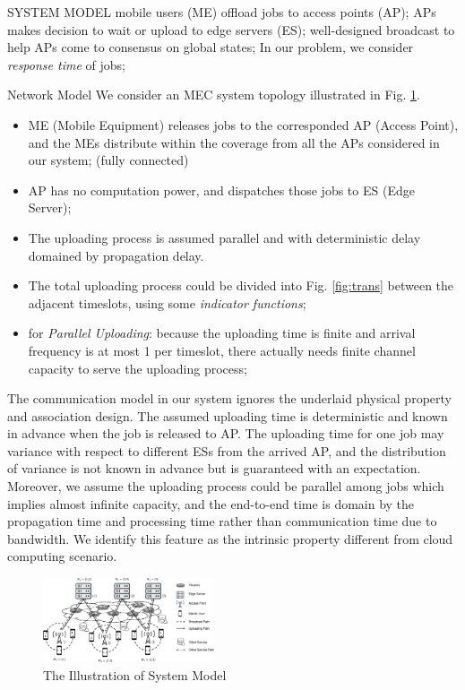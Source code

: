 \documentclass[10pt, conference, letterpaper]{IEEEtran}
\begin{document}
    \begin{section}{SYSTEM MODEL}
        \label{sec:model}
        mobile users (ME) offload jobs to access points (AP);
        APs makes decision to wait or upload to edge servers (ES);
        well-designed broadcast to help APs come to consensus on global states;
        In our problem, we consider \emph{response time} of jobs;

        \begin{subsection}{Network Model}
            We consider an MEC system topology illustrated in Fig. \ref{fig:system}.
            \begin{itemize}
                \item ME (Mobile Equipment) releases jobs to the corresponded AP (Access Point), and the MEs distribute within the coverage from all the APs considered in our system; (fully connected)
                \item AP has no computation power, and dispatches those jobs to ES (Edge Server);
                \item The uploading process is assumed parallel and with deterministic delay domained by propagation delay.
                \item The total uploading process could be divided into Fig. \ref{fig:trans} between the adjacent timeslots, using some \emph{indicator functions};
                \item for \emph{Parallel Uploading}: because the uploading time is finite and arrival frequency is at most 1 per timeslot, there actually needs finite channel capacity to serve the uploading process;
            \end{itemize}

            The communication model in our system ignores the underlaid physical property and association design.
            The assumed uploading time is deterministic and known in advance when the job is released to AP. The uploading time for one job may variance with respect to different ESs from the arrived AP, and the distribution of variance is not known in advance but is guaranteed with an expectation.
            Moreover, we assume the uploading process could be parallel among jobs which implies almost infinite capacity, and the end-to-end time is domain by the propagation time and processing time rather than communication time due to bandwidth. We identify this feature as the intrinsic property different from cloud computing scenario.
            \begin{figure}[ht]
                \centering
                \includegraphics[width=0.45\textwidth, trim={0.5cm 0.5cm 0.5cm 0.5cm}, clip]{system-model.pdf}
                \caption{The Illustration of System Model}
                \label{fig:system}
            \end{figure}
                

\end{subsection}
\end{section}
\end{document}

